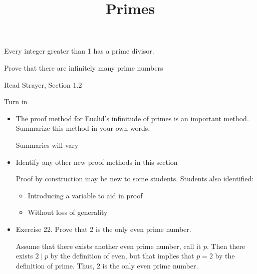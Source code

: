 \documentclass{../ximera}
\title{Primes}
\begin{document}
\begin{abstract}
\end{abstract}
\maketitle


\begin{obj}
\item  Every integer greater than 1 has a prime divisor.
\item  Prove that there are infinitely many prime numbers
\end{obj}

\begin{pre}
 \item[Read] Strayer, Section 1.2
 \item[Turn in] 
\begin{itemize}
 \item The proof method for Euclid's infinitude of primes is an important method. Summarize this method in your own words.
 
\begin{solution}
 Summaries will vary
\end{solution}
 \item Identify any other new proof methods in this section
 
\begin{solution}
 Proof by construction may be new to some students. Students also identified: 
\begin{itemize}
 \item Introducing a variable to aid in proof
 \item Without loss of generality
 
\end{itemize}
\end{solution}
 \item Exercise 22. Prove that 2 is the only even prime number.
 
\begin{solution}
 Assume that there exists another even prime number, call it $p$. Then there exists $2\mid p$ by the definition of even, but that implies that $p=2$ by the definition of prime. Thus, $2$ is the only even prime number.
\end{solution}
\end{itemize}
\end{pre}
\end{document}
